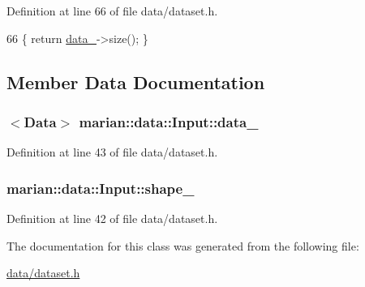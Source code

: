 Definition at line 66 of file data/dataset.\+h.


\begin{DoxyCode}
66 \{ \textcolor{keywordflow}{return} \hyperlink{classmarian_1_1data_1_1Input_a16dd53788b952dfd6f4d422b857d33ca}{data\_}->size(); \}
\end{DoxyCode}


\subsection{Member Data Documentation}
\subsubsection[{\texorpdfstring{data\+\_\+}{data_}}]{$<${\bf Data}$>$ marian\+::data\+::\+Input\+::data\+\_\+\hspace{0.3cm}{\ttfamily [private]}}\hypertarget{classmarian_1_1data_1_1Input_a16dd53788b952dfd6f4d422b857d33ca}{}\label{classmarian_1_1data_1_1Input_a16dd53788b952dfd6f4d422b857d33ca}


Definition at line 43 of file data/dataset.\+h.

\subsubsection[{\texorpdfstring{shape\+\_\+}{shape_}}]{ marian\+::data\+::\+Input\+::shape\+\_\+\hspace{0.3cm}{\ttfamily [private]}}\hypertarget{classmarian_1_1data_1_1Input_a0503e6dd9e0d87d5af3779824ddaea78}{}\label{classmarian_1_1data_1_1Input_a0503e6dd9e0d87d5af3779824ddaea78}


Definition at line 42 of file data/dataset.\+h.



The documentation for this class was generated from the following file\+:\begin{DoxyCompactItemize}
\item 
\hyperlink{data_2dataset_8h}{data/dataset.\+h}\end{DoxyCompactItemize}
